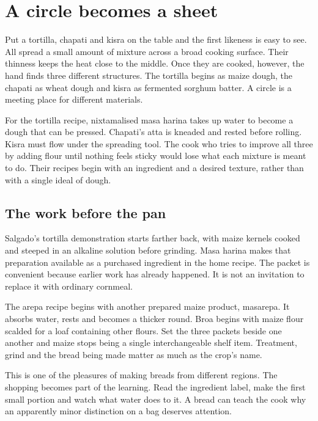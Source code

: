 \chapter{A circle becomes a sheet}\label{connection:sheets}

Put a tortilla, chapati and kisra on the table and the first likeness is easy to see. All spread a small amount of mixture across a broad cooking surface. Their thinness keeps the heat close to the middle. Once they are cooked, however, the hand finds three different structures. The tortilla begins as maize dough, the chapati as wheat dough and kisra as fermented sorghum batter. A circle is a meeting place for different materials.

For the tortilla recipe, nixtamalised masa harina takes up water to become a dough that can be pressed. Chapati's atta is kneaded and rested before rolling. Kisra must flow under the spreading tool. The cook who tries to improve all three by adding flour until nothing feels sticky would lose what each mixture is meant to do. Their recipes begin with an ingredient and a desired texture, rather than with a single ideal of dough.\citep{patitortilla08,manaliroti06,moggakisra}

\section{The work before the pan}
Salgado's tortilla demonstration starts farther back, with maize kernels cooked and steeped in an alkaline solution before grinding. Masa harina makes that preparation available as a purchased ingredient in the home recipe. The packet is convenient because earlier work has already happened. It is not an invitation to replace it with ordinary cornmeal.\citep{tortilla,cimmytnixt08}

The arepa recipe begins with another prepared maize product, masarepa. It absorbs water, rests and becomes a thicker round. Broa begins with maize flour scalded for a loaf containing other flours. Set the three packets beside one another and maize stops being a single interchangeable shelf item. Treatment, grind and the bread being made matter as much as the crop's name.\citep{goyaarepa08,broarecipe}

This is one of the pleasures of making breads from different regions. The shopping becomes part of the learning. Read the ingredient label, make the first small portion and watch what water does to it. A bread can teach the cook why an apparently minor distinction on a bag deserves attention.

